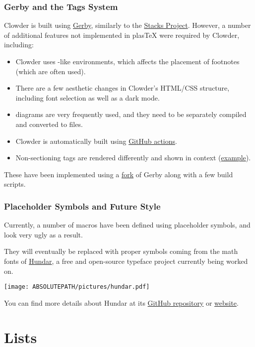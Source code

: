 \subsubsection{Gerby and the Tags System}\label{subsubsection-gerby-and-the-tags-system}
Clowder is built using \href{https://gerby-project.github.io/}{Gerby}, similarly to the \href{https://stacks.math.columbia.edu/}{Stacks Project}. However, a number of additional features not implemented in plasTeX were required by Clowder, including:
\begin{itemize}
    \item Clowder uses -like environments, which affects the placement of footnotes (which are often used).
    \item There are a few aesthetic changes in Clowder’s HTML/CSS structure, including font selection as well as a dark mode.
    \item {} diagrams are very frequently used, and they need to be separately compiled and converted to  files.
    \item Clowder is automatically built using \href{https://github.com/The-Clowder-Project/the-clowder-project/actions}{GitHub actions}.
    \item Non-sectioning tags are rendered differently and shown in context (\href{https://clowderproject.com/tag/012A.html}{example}).
\end{itemize}
These have been implemented using a \href{https://github.com/The-Clowder-Project/plastex}{fork} of Gerby along with a few build scripts.
\subsubsection{Placeholder Symbols and Future Style}\label{subsubsection-placeholder-symbols-and-future-style}
Currently, a number of macros have been defined using placeholder symbols, and look very ugly as a result.

They will eventually be replaced with proper symbols coming from the math fonts of \href{https://hundartypeface.com/}{Hundar}, a free and open-source typeface project currently being worked on.
\begin{center}
    \texttt{[image: ABSOLUTEPATH/pictures/hundar.pdf]}
\end{center}
You can find more details about Hundar at its \href{https://github.com/The-EPL-Type-Foundry/Hundar}{GitHub repository} or \href{https://hundartypeface.com/}{website}.
\section{Lists}\label{section-lists}
